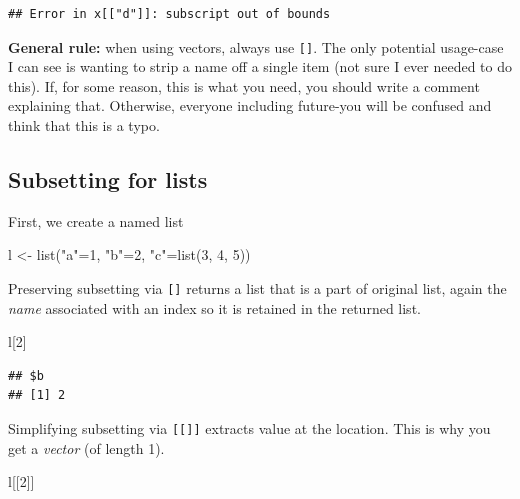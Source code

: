 \documentclass[
]{book}
\newenvironment{Shaded}{\begin{snugshade}}{\end{snugshade}}
\newcommand{\DecValTok}[1]{\textcolor[rgb]{0.00,0.00,0.81}{#1}}
\newcommand{\FunctionTok}[1]{\textcolor[rgb]{0.00,0.00,0.00}{#1}}
\newcommand{\NormalTok}[1]{#1}
\newcommand{\OtherTok}[1]{\textcolor[rgb]{0.56,0.35,0.01}{#1}}
\newcommand{\StringTok}[1]{\textcolor[rgb]{0.31,0.60,0.02}{#1}}
\begin{document}
\begin{verbatim}
## Error in x[["d"]]: subscript out of bounds
\end{verbatim}

\textbf{General rule:} when using vectors, always use \texttt{{[}{]}}. The only potential usage-case I can see is wanting to strip a name off a single item (not sure I ever needed to do this). If, for some reason, this is what you need, you should write a comment explaining that. Otherwise, everyone including future-you will be confused and think that this is a typo.

\hypertarget{subsetting-for-lists}{%
\subsection{Subsetting for lists}\label{subsetting-for-lists}}

First, we create a named list

\begin{Shaded}
\begin{Highlighting}[]
\NormalTok{l }\OtherTok{\textless{}{-}} \FunctionTok{list}\NormalTok{(}\StringTok{"a"}\OtherTok{=}\DecValTok{1}\NormalTok{, }\StringTok{"b"}\OtherTok{=}\DecValTok{2}\NormalTok{, }\StringTok{"c"}\OtherTok{=}\FunctionTok{list}\NormalTok{(}\DecValTok{3}\NormalTok{, }\DecValTok{4}\NormalTok{, }\DecValTok{5}\NormalTok{))}
\end{Highlighting}
\end{Shaded}

Preserving subsetting via \texttt{{[}{]}} returns a list that is a part of original list, again the \emph{name} associated with an index so it is retained in the returned list.

\begin{Shaded}
\begin{Highlighting}[]
\NormalTok{l[}\DecValTok{2}\NormalTok{]}
\end{Highlighting}
\end{Shaded}

\begin{verbatim}
## $b
## [1] 2
\end{verbatim}

Simplifying subsetting via \texttt{{[}{[}{]}{]}} extracts value at the location. This is why you get a \emph{vector} (of length 1).

\begin{Shaded}
\begin{Highlighting}[]
\NormalTok{l[[}\DecValTok{2}\NormalTok{]]}
\end{Highlighting}
\end{Shaded}
\end{document}
